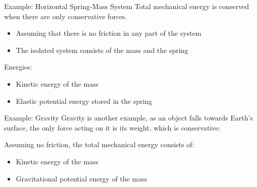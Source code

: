 \documentclass[12pt,compress,aspectratio=169]{beamer}
\begin{document}
\begin{frame}{Example: Horizontal Spring-Mass System}
  Total mechanical energy is conserved when there are only conservative forces.
  \begin{itemize}
  \item Assuming that there is no friction in any part of the system
  \item The isolated system consists of the mass and the spring
  \end{itemize}  
  Energies:
  \begin{itemize}
  \item Kinetic energy of the mass
  \item Elastic potential energy stored in the spring
  \end{itemize}
  \begin{center}
  \end{center}
\end{frame}



\begin{frame}{Example: Gravity}
  Gravity is another example, as an object falls towards Earth's surface,
  the only force acting on it is its weight, which is conservative:
  \begin{center}
  \end{center}
  Assuming no friction, the total mechanical energy consists of:
  \begin{itemize}
  \item Kinetic energy of the mass
  \item Gravitational potential energy of the mass
  \end{itemize}
\end{frame}
\end{document}
